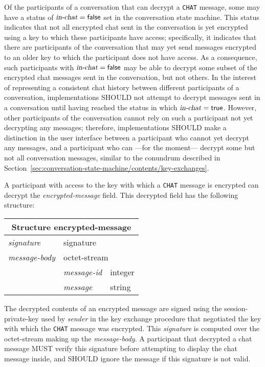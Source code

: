 \documentclass{article}
\def\npmessage#1{\texttt{#1}}
\def\field#1{\textit{#1}}
\def\smfield#1{\textsl{#1}}
\def\type#1{\textsf{#1}}
\begin{document}
Of the participants of a conversation that can decrypt a \npmessage{CHAT} message, some may have a status of $\smfield{in-chat} = \textsf{false}$ set in the conversation state machine.
This status indicates that not all encrypted chat sent in the conversation is yet encrypted using a key to which these participants have access; specifically, it indicates that there are participants of the conversation that may yet send messages encrypted to an older key to which the participant does not have access.
As a consequence, such participants with $\smfield{in-chat} = \textsf{false}$ may be able to decrypt some subset of the encrypted chat messages sent in the conversation, but not others.
In the interest of representing a consistent chat history between different participants of a conversation, implementations SHOULD not attempt to decrypt messages sent in a conversation until having reached the status in which $\smfield{in-chat} = \textsf{true}$.
However, other participants of the conversation cannot rely on such a participant not yet decrypting any messages; therefore, implementations SHOULD make a distinction in the user interface between a participant who cannot yet decrypt any messages, and a participant who can ---for the moment--- decrypt some but not all conversation messages, similar to the conundrum described in Section~\ref{sec:conversation-state-machine/contents/key-exchanges}.

A participant with access to the key with which a \npmessage{CHAT} message is encrypted can decrypt the \field{encrypted-message} field.
This decrypted field has the following structure:

\vspace{-\medskipamount}
\hspace{2em minus 2em}\begin{tabular}{|l|l|l|}
\hline
\multicolumn{3}{|c|}{Structure \type{encrypted-message}} \\
\hline
\hline
\smfield{signature} & \multicolumn{2}{|l|}{\type{signature}} \\
\hline
\smfield{message-body} & \multicolumn{2}{|l|}{\type{octet-stream}} \\
\hline
& \smfield{message-id} & \type{integer} \\
\hline
& \smfield{message} & \type{string} \\
\hline
\end{tabular}
\vspace{-\medskipamount}

The decrypted contents of an encrypted message are signed using the session-private-key used by \field{sender} in the key exchange procedure that negotiated the key with which the \npmessage{CHAT} message was encrypted.
This \field{signature} is computed over the \type{octet-stream} making up the \field{message-body}.
A participant that decrypted a chat message MUST verify this signature before attempting to display the chat message inside, and SHOULD ignore the message if this signature is not valid.
\end{document}
